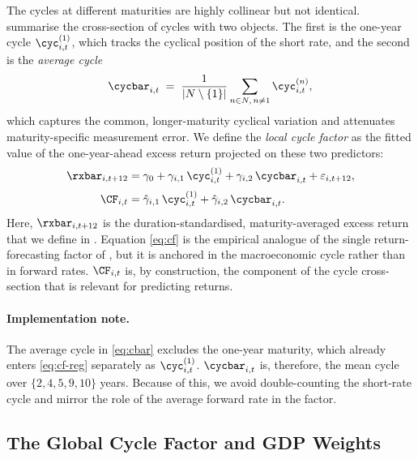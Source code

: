 The cycles at different maturities are highly collinear but not identical.
\citet{cieslak2015} summarise the cross-section of cycles with two objects.
The first is the one-year cycle $\cyc^{(1)}_{i,t}$, which tracks the cyclical
position of the short rate, and the second is the \emph{average cycle}
\begin{equation}
  \cycbar_{i,t} \;=\; \frac{1}{|N\setminus\{1\}|}
                      \sum_{n\in N,\, n\neq 1}\cyc^{(n)}_{i,t},
  \label{eq:cbar}
\end{equation}
which captures the common, longer-maturity cyclical variation and attenuates
maturity-specific measurement error. We define the \emph{local cycle factor} as
the fitted value of the one-year-ahead excess return projected on these two
predictors:
\begin{align}
  \rxbar_{i,t+12} &= \gamma_{0} + \gamma_{i,1}\,\cyc^{(1)}_{i,t}
                     + \gamma_{i,2}\,\cycbar_{i,t} + \varepsilon_{i,t+12},
                     \label{eq:cf-reg}\\[2pt]
  \CF_{i,t}       &= \hat\gamma_{i,1}\,\cyc^{(1)}_{i,t}
                     + \hat\gamma_{i,2}\,\cycbar_{i,t}.
                     \label{eq:cf}
\end{align}
Here, $\rxbar_{i,t+12}$ is the duration-standardised, maturity-averaged excess
return that we define in . Equation \eqref{eq:cf} is the
empirical analogue of the single return-forecasting factor of
\citet{cochrane2005}, but it is anchored in the macroeconomic cycle rather than
in forward rates. $\CF_{i,t}$ is, by construction, the component of the cycle
cross-section that is relevant for predicting returns.

\paragraph{Implementation note.} The average cycle in \eqref{eq:cbar} excludes
the one-year maturity, which already enters \eqref{eq:cf-reg} separately as
$\cyc^{(1)}_{i,t}$. $\cycbar_{i,t}$ is, therefore, the mean cycle over
$\{2,4,5,9,10\}$ years. Because of this, we avoid double-counting the
short-rate cycle and mirror the role of the average forward rate in the
\citet{cochrane2005} factor.

\subsection{The Global Cycle Factor and GDP Weights}
\label{sec:fw-gcf}

